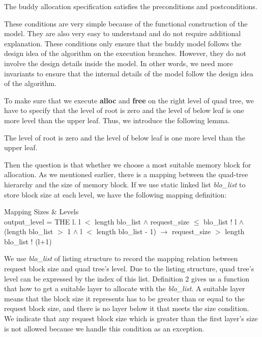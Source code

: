 \documentclass[runningheads]{llncs}
\begin{document}
\begin{theorem}
The buddy allocation specification satisfies the preconditions and postconditions.
\end{theorem}

These conditions are very simple because of the functional construction of the model. They are also very easy to understand and do not require additional explanation. These conditions only ensure that the buddy model follows the design idea of the algorithm on the execution branches. However, they do not involve the design details inside the model. In other words, we need more invariants to ensure that the internal details of the model follow the design idea of the algorithm.

To make sure that we execute \textbf{alloc} and \textbf{free} on the right level of quad tree, we have to specify that the level of root is zero and the level of below leaf is one more level than the upper leaf. Thus, we introduce the following lemma.

\begin{lemma}
	The level of root is zero and the level of below leaf is one more level than the upper leaf.
\end{lemma}

Then the question is that whether we choose a most suitable memory block for allocation. As we mentioned earlier, there is a mapping between the quad-tree hierarchy and the size of memory block. If we use static linked list \textsl{blo\_list} to store block size at each level, we have the following mapping definition:

\begin{definition} {Mapping Sizes $\&$ Levels} \\
output\_level = THE l. l $<$ length blo\_list $\wedge$ request\_size $\le$ blo\_list ! l $\wedge$ (length blo\_list $>$ 1 $\wedge$ l $<$ length blo\_list - 1) $\longrightarrow$ request\_size $>$ length blo\_list ! (l+1)
\end{definition}

We use \textsl{blo\_list} of listing structure to record the mapping relation between request block size and quad tree's level. Due to the listing structure, quad tree's level can be expressed by the index of this list. Definition 2 gives us a function that how to get a suitable layer to allocate with the \textsl{blo\_list}. A suitable layer means that the block size it represents has to be greater than or equal to the request block size, and there is no layer below it that meets the size condition. We indicate that any request block size which is greater than the first layer's size is not allowed because we handle this condition as an exception.
\end{document}

